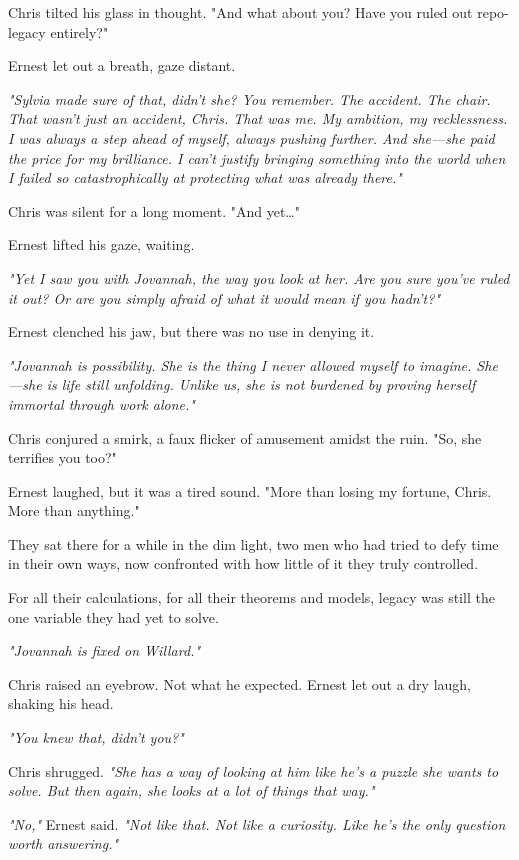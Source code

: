 Chris tilted his glass in thought. "And what about you? Have you ruled out repo-legacy entirely?"

Ernest let out a breath, gaze distant.

\textit{"Sylvia made sure of that, didn’t she? You remember. The accident. The chair. That wasn’t just an accident, Chris. That was me. My ambition, my recklessness. I was always a step ahead of myself, always pushing further. And she—she paid the price for my brilliance. I can’t justify bringing something into the world when I failed so catastrophically at protecting what was already there."}

Chris was silent for a long moment. "And yet…"

Ernest lifted his gaze, waiting.

\textit{"Yet I saw you with Jovannah, the way you look at her. Are you sure you’ve ruled it out? Or are you simply afraid of what it would mean if you hadn’t?"}

Ernest clenched his jaw, but there was no use in denying it.

\textit{"Jovannah is possibility. She is the thing I never allowed myself to imagine. She—she is life still unfolding. Unlike us, she is not burdened by proving herself immortal through work alone."}

Chris conjured a smirk, a faux flicker of amusement amidst the ruin. "So, she terrifies you too?"

Ernest laughed, but it was a tired sound. "More than losing my fortune, Chris. More than anything."

They sat there for a while in the dim light, two men who had tried to defy time in their own ways, now confronted with how little of it they truly controlled.

For all their calculations, for all their theorems and models, legacy was still the one variable they had yet to solve.

\textit{"Jovannah is fixed on Willard."}

Chris raised an eyebrow. Not what he expected. Ernest let out a dry laugh, shaking his head.

\textit{"You knew that, didn’t you?"}

Chris shrugged. \textit{"She has a way of looking at him like he’s a puzzle she wants to solve. But then again, she looks at a lot of things that way."}

\textit{"No,"} Ernest said. \textit{"Not like that. Not like a curiosity. Like he's the only question worth answering."}


